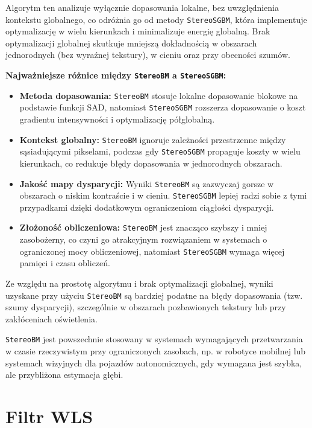 \documentclass[magisterska]{pracadypl}
\begin{document}
Algorytm ten analizuje wyłącznie dopasowania lokalne, bez uwzględnienia kontekstu globalnego, co odróżnia go od metody \texttt{StereoSGBM}, która implementuje optymalizację w wielu kierunkach i minimalizuje energię globalną. Brak optymalizacji globalnej skutkuje mniejszą dokładnością w obszarach jednorodnych (bez wyraźnej tekstury), w cieniu oraz przy obecności szumów.  

\textbf{Najważniejsze różnice między \texttt{StereoBM} a \texttt{StereoSGBM}:}
\begin{itemize}
    \item \textbf{Metoda dopasowania:}  
    \texttt{StereoBM} stosuje lokalne dopasowanie blokowe na podstawie funkcji SAD, natomiast \texttt{StereoSGBM} rozszerza dopasowanie o koszt gradientu intensywności i optymalizację półglobalną.
    
    \item \textbf{Kontekst globalny:}  
    \texttt{StereoBM} ignoruje zależności przestrzenne między sąsiadującymi pikselami, podczas gdy \texttt{StereoSGBM} propaguje koszty w wielu kierunkach, co redukuje błędy dopasowania w jednorodnych obszarach.
    
    \item \textbf{Jakość mapy dysparycji:}  
    Wyniki \texttt{StereoBM} są zazwyczaj gorsze w obszarach o niskim kontraście i w cieniu. \texttt{StereoSGBM} lepiej radzi sobie z tymi przypadkami dzięki dodatkowym ograniczeniom ciągłości dysparycji.
    
    \item \textbf{Złożoność obliczeniowa:}  
    \texttt{StereoBM} jest znacząco szybszy i mniej zasobożerny, co czyni go atrakcyjnym rozwiązaniem w systemach o ograniczonej mocy obliczeniowej, natomiast \texttt{StereoSGBM} wymaga więcej pamięci i czasu obliczeń.
\end{itemize}

Ze względu na prostotę algorytmu i brak optymalizacji globalnej, wyniki uzyskane przy użyciu \texttt{StereoBM} są bardziej podatne na błędy dopasowania (tzw. szumy dysparycji), szczególnie w obszarach pozbawionych tekstury lub przy zakłóceniach oświetlenia.

\texttt{StereoBM} jest powszechnie stosowany w systemach wymagających przetwarzania w czasie rzeczywistym przy ograniczonych zasobach, np. w robotyce mobilnej lub systemach wizyjnych dla pojazdów autonomicznych, gdy wymagana jest szybka, ale przybliżona estymacja głębi.

\section{Filtr WLS}
\end{document}
